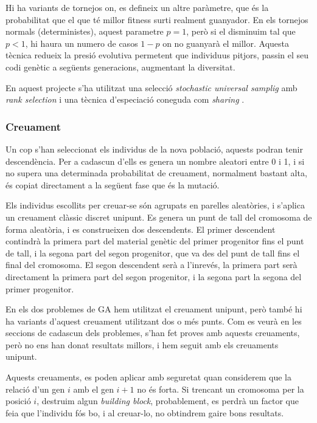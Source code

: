 \documentclass[titlepage,a4paper,12pt]{book}
\begin{document}
Hi ha variants de tornejos on, es defineix un altre paràmetre, que és la
probabilitat que el que té millor fitness surti realment guanyador.  En els
tornejos normals (deterministes), aquest parametre $p=1$, però si el disminuim
tal que $p<1$, hi haura un numero de casos $1-p$ on no guanyarà el millor.
Aquesta tècnica redueix la presió evolutiva permetent que individuus pitjors,
passin el seu codi genètic a següents generacions, augmentant la diversitat.

En aquest projecte s'ha utilitzat una selecció \emph{stochastic
universal samplig} \cite{B87a} amb \emph{rank selection} \cite{B87b} i una
tècnica d'especiació coneguda com \emph{sharing} \cite{33}.

\subsubsection{Creuament}

Un cop s'han seleccionat els individus de la nova població, aquests podran tenir
descendència. Per a cadascun d'ells es genera un nombre aleatori entre 0 i 1, i
si no supera una determinada probabilitat de creuament, normalment bastant alta,
és copiat directament a la següent fase que és la mutació.

Els individus escollits per creuar-se són agrupats en parelles aleatòries, i
s'aplica un creuament clàssic discret unipunt.  Es genera un punt de tall del
cromosoma de forma aleatòria, i es construeixen dos descendents. El primer
descendent contindrà la primera part del material genètic del primer progenitor
fins el punt de tall, i la segona part del segon progenitor, que va des del punt
de tall fins el final del cromosoma. El segon descendent serà a l'inrevés, la
primera part serà directament la primera part del segon progenitor, i la segona
part la segona del primer progenitor.

En els dos problemes de GA hem utilitzat el creuament unipunt, però també hi
ha variants d'aquest creuament utilitzant dos o més punts.  Com es veurà en les
seccions de cadascun dels problemes, s'han fet proves amb aquests creuaments,
però no ens han donat resultats millors, i hem seguit amb els creuaments
unipunt.

Aquests creuaments, es poden aplicar amb seguretat quan considerem que la
relació d'un gen $i$ amb el gen $i+1$ no és forta.  Si trencant un cromosoma per
la posició $i$, destruim algun \emph{building block}, probablement, es perdrà un
factor que feia que l'individu fós bo, i al creuar-lo, no obtindrem gaire bons
resultats.
\end{document}
